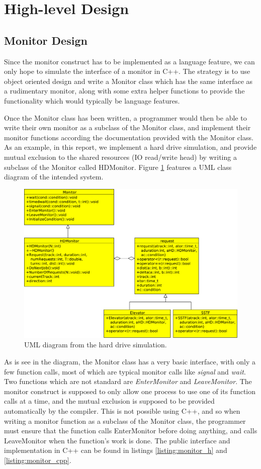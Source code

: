\documentclass{report}
\begin{document}
\section{High-level Design} %
\subsection{Monitor Design}
Since the monitor construct has to be implemented as a language feature, we can only hope to
simulate the interface of a monitor in C++. The strategy is to use object oriented design
and write a Monitor class which has the same interface as a rudimentary monitor, along
with some extra helper functions to provide the functionality which would typically be
language features. 

Once the Monitor class has been written, a programmer would then be able to write their
own monitor as a subclass of the Monitor class, and implement their monitor functions
according the documentation provided with the Monitor class. As an example, in this
report, we implement a hard drive simulation, and provide mutual exclusion to the shared
resources (IO read/write head) by writing a subclass of the Monitor called HDMonitor.
Figure \ref{fig:UML} features a UML class diagram of the intended system.
\begin{figure}[htb!]
    \centering
    \includegraphics[scale=0.5]{300UML.pdf}
    \caption{UML diagram from the hard drive simulation.}
    \label{fig:UML}
\end{figure}

As is see in the diagram, the Monitor class has a very basic interface, with only a few
function calls, most of which are typical monitor calls like \emph{signal} and
\emph{wait}. Two functions which are not standard are \emph{EnterMonitor} and
\emph{LeaveMonitor}. The monitor construct is supposed to only allow one process to use
one of its function calls at a time, and the mutual exclusion is supposed to be provided
automatically by the compiler. This is not possible using C++, and so when writing a
monitor function as a subclass of the Monitor class, the programmer must ensure that the
function calls EnterMonitor before doing anything, and calls LeaveMonitor when the
function's work is done. The public interface and implementation in C++ can be found in
listings \ref{listing:monitor_h} and \ref{listing:monitor_cpp}.
\end{document}

